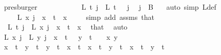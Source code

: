 \begin{isabellebody}
\ presburger\isanewline
\isanewline
\ \ \ \ \ \ \ \ \ \ \isamarkupfalse%
\ {\isachardoublequoteopen}L{\isacharprime}{\kern0pt}\ t\ j\ {\isacharequal}{\kern0pt}\ L{\isacharprime}{\kern0pt}\ {\isacharparenleft}{\kern0pt}t\ {\isacharminus}{\kern0pt}\ {}{\isacharparenright}{\kern0pt}\ j{\isachardoublequoteclose}\ \isamarkupfalse%
\ {\isacartoucheopen}j\ {\isasymin}\ B\ {}{\isacartoucheclose}\ \isamarkupfalse%
\ {\isacharparenleft}{\kern0pt}auto\ simp{\isacharcolon}{\kern0pt}\ L{\isacharprime}{\kern0pt}{\isacharunderscore}{\kern0pt}def{\isacharparenright}{\kern0pt}\isanewline
\ \ \ \ \ \ \ \ \ \ \isamarkupfalse%
\ \isamarkupfalse%
\ {\isachardoublequoteopen}{\isachardot}{\kern0pt}{\isachardot}{\kern0pt}{\isachardot}{\kern0pt}\ {\isacharequal}{\kern0pt}\ L{\isacharprime}{\kern0pt}\ x\ j{\isachardoublequoteclose}\ \ {\isachardoublequoteopen}x\ {\isacharless}{\kern0pt}\ t{\isachardoublequoteclose}\ \ x\ \isamarkupfalse%
\ {\isacharasterisk}{\kern0pt}\ \isamarkupfalse%
\ {\isacharparenleft}{\kern0pt}simp\ add{\isacharcolon}{\kern0pt}\ assms{\isacharparenleft}{\kern0pt}{}{\isacharparenright}{\kern0pt}\ that{\isacharparenright}{\kern0pt}\isanewline
\ \ \ \ \ \ \ \ \ \ \isamarkupfalse%
\ \isamarkupfalse%
\ {\isacharasterisk}{\kern0pt}{\isacharasterisk}{\kern0pt}{\isacharcolon}{\kern0pt}\ {\isachardoublequoteopen}L{\isacharprime}{\kern0pt}\ t\ j\ {\isacharequal}{\kern0pt}\ L{\isacharprime}{\kern0pt}\ x\ j{\isachardoublequoteclose}\ \ {\isachardoublequoteopen}x\ {\isacharless}{\kern0pt}\ t{\isachardoublequoteclose}\ \ x\ \isamarkupfalse%
\ that\ \isamarkupfalse%
\ auto\isanewline
\ \ \ \ \ \ \ \ \ \ \isamarkupfalse%
\ {\isachardoublequoteopen}L{\isacharprime}{\kern0pt}\ x\ j\ {\isacharequal}{\kern0pt}\ L{\isacharprime}{\kern0pt}\ y\ j{\isachardoublequoteclose}\ \ {\isachardoublequoteopen}x\ {\isacharless}{\kern0pt}\ t\ {\isacharplus}{\kern0pt}\ {}{\isachardoublequoteclose}\ {\isachardoublequoteopen}y\ {\isacharless}{\kern0pt}\ t\ {\isacharplus}{\kern0pt}\ {}{\isachardoublequoteclose}\ \ x\ y\ \isanewline
\ \ \ \ \ \ \ \ \ \ \isamarkupfalse%
{\isacharminus}{\kern0pt}\isanewline
\ \ \ \ \ \ \ \ \ \ \ \ \isamarkupfalse%
\ {\isachardoublequoteopen}x\ {\isacharless}{\kern0pt}\ t\ {\isasymand}\ y\ {\isacharequal}{\kern0pt}\ t{\isachardoublequoteclose}\ {\isacharbar}{\kern0pt}\ {\isachardoublequoteopen}y\ {\isacharless}{\kern0pt}\ t\ {\isasymand}\ x\ {\isacharequal}{\kern0pt}\ t{\isachardoublequoteclose}\ {\isacharbar}{\kern0pt}\ {\isachardoublequoteopen}x\ {\isacharequal}{\kern0pt}\ t\ {\isasymand}\ y\ {\isacharequal}{\kern0pt}\ t{\isachardoublequoteclose}\ {\isacharbar}{\kern0pt}\ {\isachardoublequoteopen}x\ {\isacharless}{\kern0pt}\ t\ {\isasymand}\ y\ {\isacharless}{\kern0pt}\ t{\isachardoublequoteclose}\ \isamarkupfalse%

\end{isabellebody}
